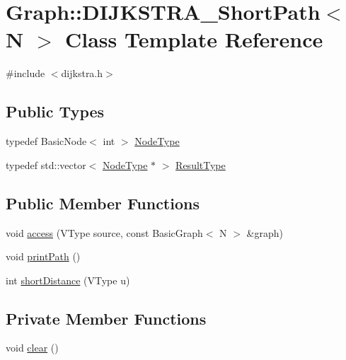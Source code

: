 \hypertarget{class_graph_1_1_d_i_j_k_s_t_r_a___short_path}{}\section{Graph\+:\+:D\+I\+J\+K\+S\+T\+R\+A\+\_\+\+Short\+Path$<$ N $>$ Class Template Reference}
\label{class_graph_1_1_d_i_j_k_s_t_r_a___short_path}


{\ttfamily \#include $<$dijkstra.\+h$>$}

\subsection*{Public Types}
\begin{DoxyCompactItemize}
\item 
typedef Basic\+Node$<$ int $>$ \hyperlink{class_graph_1_1_d_i_j_k_s_t_r_a___short_path_a0d077fc4311ea53b580be6eaa9f3ea65}{Node\+Type}
\item 
typedef std\+::vector$<$ \hyperlink{class_graph_1_1_d_i_j_k_s_t_r_a___short_path_a0d077fc4311ea53b580be6eaa9f3ea65}{Node\+Type} $\ast$ $>$ \hyperlink{class_graph_1_1_d_i_j_k_s_t_r_a___short_path_ae91c7c8c41a2052eb4e25f3f5751b1bc}{Result\+Type}
\end{DoxyCompactItemize}
\subsection*{Public Member Functions}
\begin{DoxyCompactItemize}
\item 
void \hyperlink{class_graph_1_1_d_i_j_k_s_t_r_a___short_path_a23c1b697645c97876a8fe368c08269ca}{access} (V\+Type source, const Basic\+Graph$<$ N $>$ \&graph)
\item 
void \hyperlink{class_graph_1_1_d_i_j_k_s_t_r_a___short_path_a2ecc66098ec2e460c34ed2133acb3504}{print\+Path} ()
\item 
int \hyperlink{class_graph_1_1_d_i_j_k_s_t_r_a___short_path_a5f4efa4643762042b99633a4e0135dc4}{short\+Distance} (V\+Type u)
\end{DoxyCompactItemize}
\subsection*{Private Member Functions}
\begin{DoxyCompactItemize}
\item 
void \hyperlink{class_graph_1_1_d_i_j_k_s_t_r_a___short_path_a3365b3c0b6e429a2b19202dea81500c4}{clear} ()
\end{DoxyCompactItemize}
